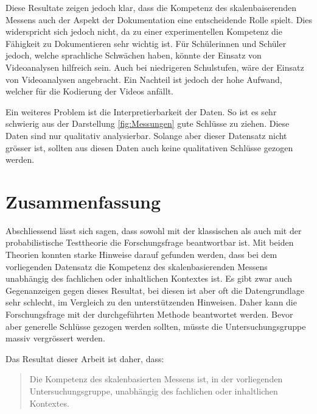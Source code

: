Diese Resultate zeigen jedoch klar, dass die Kompetenz des skalenbaiserenden Messens auch der Aspekt der Dokumentation eine entscheidende Rolle spielt. Dies widerspricht sich jedoch nicht, da zu einer experimentellen Kompetenz die Fähigkeit zu Dokumentieren sehr wichtig ist. Für Schülerinnen und Schüler jedoch, welche sprachliche Schwächen haben, könnte der Einsatz von Videoanalysen hilfreich sein. Auch bei niedrigeren Schulstufen, wäre der Einsatz von Videoanalysen angebracht. Ein Nachteil ist jedoch der hohe Aufwand, welcher für die Kodierung der Videos anfällt. 

Ein weiteres Problem ist die Interpretierbarkeit der Daten. So ist es sehr schwierig aus der Darstellung \ref{fig:Messungen} gute Schlüsse zu ziehen. Diese Daten sind nur qualitativ analysierbar. Solange aber dieser Datensatz nicht grösser ist, sollten aus diesen Daten auch keine qualitativen Schlüsse gezogen werden.

\section{Zusammenfassung}

Abschliessend lässt sich sagen, dass sowohl mit der klassischen als auch mit der probabilistische Testtheorie die Forschungsfrage beantwortbar ist. Mit beiden Theorien konnten starke Hinweise darauf gefunden werden, dass bei dem vorliegenden Datensatz die Kompetenz des skalenbasierenden Messens unabhängig des fachlichen oder inhaltlichen Kontextes ist. Es gibt zwar auch Gegenanzeigen gegen dieses Resultat, bei diesen ist aber oft die Datengrundlage sehr schlecht, im Vergleich zu den unterstützenden Hinweisen. Daher kann die Forschungsfrage mit der durchgeführten Methode beantwortet werden. Bevor aber generelle Schlüsse gezogen werden sollten, müsste die Untersuchungsgruppe massiv vergrössert werden. 

Das Resultat dieser Arbeit ist daher, dass:
\begin{quote}
 Die Kompetenz des skalenbasierten Messens ist, in der vorliegenden Untersuchungsgruppe, unabhängig des fachlichen oder inhaltlichen Kontextes.
\end{quote}



